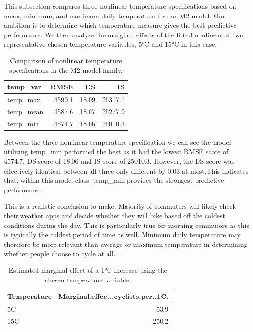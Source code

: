 \documentclass[
]{article}
\begin{document}
This subsection compares three nonlinear temperature specifications based on mean, minimum, and maximum daily temperature for our M2 model. Our ambition is to determine which temperature measure gives the best predictive performance. We then analyse the marginal effects of the fitted nonlinear at two representative chosen temperature variables, 5°C and 15°C in this case.

\begin{table}

\caption{\label{tab:unnamed-chunk-5}Comparison of nonlinear temperature specifications in the M2 model family.}
\centering
\begin{tabular}[t]{lrrr}
\toprule
temp\_var & RMSE & DS & IS\\
\midrule
temp\_max & 4599.1 & 18.09 & 25317.1\\
temp\_mean & 4587.6 & 18.07 & 25277.9\\
temp\_min & 4574.7 & 18.06 & 25010.3\\
\bottomrule
\end{tabular}
\end{table}

Between the three nonlinear temperature specification we can see the model utilizing temp\_min performed the best as it had the lowest RMSE score of 4574.7, DS score of 18.06 and IS score of 25010.3. However, the DS score was effectively identical between all three only different by 0.03 at most.This indicates that, within this model class, temp\_min provides the strongest predictive performance.

This is a realistic conclusion to make. Majority of commuters will likely check their weather apps and decide whether they will bike based off the coldest conditions during the day. This is particularly true for morning commuters as this is typically the coldest period of time as well. Minimum daily temperature may therefore be more relevant than average or maximum temperature in determining whether people choose to cycle at all.

\begin{table}

\caption{\label{tab:unnamed-chunk-6}Estimated marginal effect of a 1°C increase using the chosen temperature variable.}
\centering
\begin{tabular}[t]{lr}
\toprule
Temperature & Marginal.effect..cyclists.per..1C.\\
\midrule
5C & 53.9\\
15C & -250.2\\
\bottomrule
\end{tabular}
\end{table}
\end{document}
